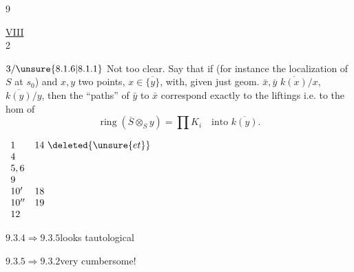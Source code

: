 9

\uline{VIII}\\
\hspace*{3em}2

$3/\unsure{8.1.6|8.1.1}$ Not too clear. Say that if
(for instance the localization of $S$ at $s_0$)
and 
$x,y$ two points, $x\in\overline{\{y\}}$,
 with, given just geom. $\bar x,\bar y$
$\overline{k(x)}/x$, $\overline{k(y)}/y$, then the ``paths'' of $\bar y$ to $\bar x$
correspond exactly to the  liftings
i.e. to the hom of
\[
\operatorname{ring}(\overline S\otimes_S y)=\prod K_i
\quad\text{into }\overline{k(y)}.
\]

\quad
$\begin{array}{ll}
1&14\ \deleted{\unsure{et}}\\
4&\\
5,6&\\
9&\\
10'&18\\
10''&19\\
12&
\end{array}$

$9.3.4\Rightarrow9.3.5$\quad looks tautological

$9.3.5\Rightarrow9.3.2$\quad very cumbersome!



